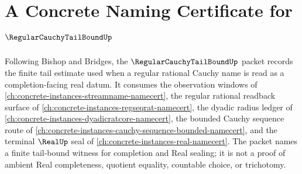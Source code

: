 \chapter{A Concrete Naming Certificate for $\RegularCauchyTailBoundUp$}
\label{ch:concrete-instances-regular-cauchy-tail-bound-namecert}

Following Bishop and Bridges, the $\RegularCauchyTailBoundUp$ packet records the finite tail estimate used when a regular rational Cauchy name is read as a completion-facing real datum. It consumes the observation windows of \autoref{ch:concrete-instances-streamname-namecert}, the regular rational readback surface of \autoref{ch:concrete-instances-regseqrat-namecert}, the dyadic radius ledger of \autoref{ch:concrete-instances-dyadicratcore-namecert}, the bounded Cauchy sequence route of \autoref{ch:concrete-instances-cauchy-sequence-bounded-namecert}, and the terminal $\RealUp$ seal of \autoref{ch:concrete-instances-real-namecert}. The packet names a finite tail-bound witness for completion and Real sealing; it is not a proof of ambient Real completeness, quotient equality, countable choice, or trichotomy.

